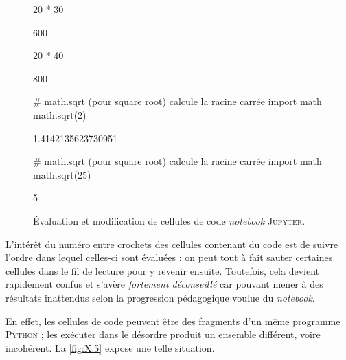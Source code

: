 \begin{figure}
\begin{nbjupyterin}{1}
20 * 30
\end{nbjupyterin}
\begin{nbjupyterout}{1}
600
\end{nbjupyterout}
\begin{nbjupyterin}{1}
20 * 40
\end{nbjupyterin}
\begin{nbjupyterout}{1}
800
\end{nbjupyterout}
\begin{nbjupyterin}{2}
# math.sqrt (pour square root) calcule la racine carrée
import math
math.sqrt(2)
\end{nbjupyterin}
\begin{nbjupyterout}{2}
1.4142135623730951
\end{nbjupyterout}
\begin{nbjupyterin}{2}
# math.sqrt (pour square root) calcule la racine carrée
import math
math.sqrt(25)
\end{nbjupyterin}
\begin{nbjupyterout}{2}
5
\end{nbjupyterout}
\caption{\label{fig:X.4}Évaluation et modification de cellules de code \emph{notebook} \textsc{Jupyter}.}
\end{figure}

\vspace*{-2pt}

L'intérêt du numéro entre crochets des cellules contenant du code est de suivre l'ordre dans lequel celles-ci sont évaluées : on peut tout à fait sauter certaines cellules dans le fil de lecture pour y revenir ensuite. Toutefois, cela devient rapidement confus et s'avère \emph{fortement déconseillé} car pouvant mener à des résultats inattendus selon la progression pédagogique voulue du \textit{notebook}. 

En effet, les cellules de code peuvent être des fragments d'un même programme \textsc{Python} ; les exécuter dans le désordre produit un ensemble différent, voire incohérent. La \cref{fig:X.5} expose une telle situation.

